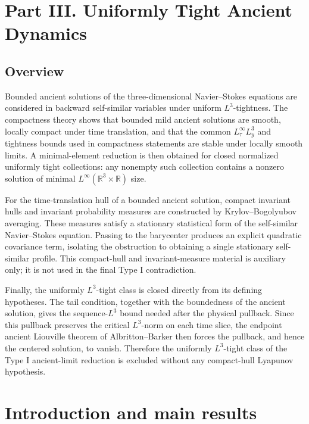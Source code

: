 \documentclass[11pt]{amsart}
\theoremstyle{plain}
\theoremstyle{definition}
\theoremstyle{remark}
\numberwithin{equation}{section}
\newcommand{\R}{\mathbb R}
\begin{document}
\clearpage
\section*{Part III. Uniformly Tight Ancient Dynamics}

\subsection*{Overview}

Bounded ancient solutions of the three-dimensional Navier--Stokes equations
are considered in backward self-similar variables under uniform
\(L^3\)-tightness.  The compactness theory shows that bounded mild
ancient solutions are smooth, locally compact under time translation, and that
the common \(L^\infty_\tau L^3_y\) and tightness bounds used in compactness
statements are stable under locally smooth limits.  A minimal-element reduction
is then obtained for closed normalized uniformly tight collections:
any nonempty such collection contains a nonzero solution of minimal
\(L^\infty(\R^3\times\R)\) size.

For the time-translation hull of a bounded ancient solution, compact invariant
hulls and invariant probability measures are constructed by
Krylov--Bogolyubov averaging.  These measures satisfy a stationary statistical form of the
self-similar Navier--Stokes equation.  Passing to the barycenter produces an
explicit quadratic covariance term, isolating the obstruction to obtaining a
single stationary self-similar profile.
This compact-hull and invariant-measure material is auxiliary only; it is
not used in the final Type I contradiction.

Finally, the uniformly \(L^3\)-tight class is closed directly from its defining
hypotheses.  The tail condition, together with the boundedness of the ancient
solution, gives the sequence-\(L^3\) bound needed after the physical pullback.
Since this pullback preserves the critical \(L^3\)-norm on each time slice,
the endpoint ancient Liouville theorem of Albritton--Barker then forces the
pullback, and hence the centered solution, to vanish.  Therefore the uniformly
\(L^3\)-tight class of the Type I
ancient-limit reduction is excluded without any compact-hull Lyapunov
hypothesis.

\section{Introduction and main results}\label{p2:sec:introduction}
\end{document}

